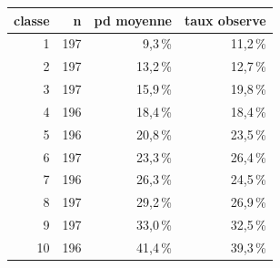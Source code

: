 \begin{tabular}{rrrr}
\toprule
\textbf{classe} & \textbf{n} & \textbf{pd moyenne} & \textbf{taux observe} \\
\midrule
1 & 197 & 9,3\,\% & 11,2\,\% \\
2 & 197 & 13,2\,\% & 12,7\,\% \\
3 & 197 & 15,9\,\% & 19,8\,\% \\
4 & 196 & 18,4\,\% & 18,4\,\% \\
5 & 196 & 20,8\,\% & 23,5\,\% \\
6 & 197 & 23,3\,\% & 26,4\,\% \\
7 & 196 & 26,3\,\% & 24,5\,\% \\
8 & 197 & 29,2\,\% & 26,9\,\% \\
9 & 197 & 33,0\,\% & 32,5\,\% \\
10 & 196 & 41,4\,\% & 39,3\,\% \\
\bottomrule
\end{tabular}
